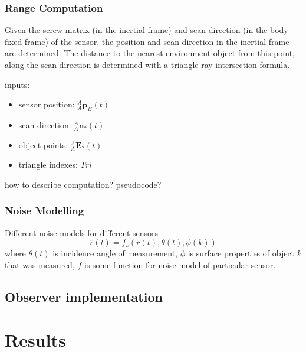 	\subsubsection{Range Computation}
	Given the screw matrix (in the inertial frame) and scan direction (in the body fixed frame) of the sensor, the position and scan direction in the inertial frame are determined.
	The distance to the nearest environment object from this point, along the scan direction is determined with a triangle-ray intersection formula.
	
	inputs:
	\begin{itemize}
	\item sensor position: ${^{A}_{A}\mathbf{p}^{}_{B}}(t)$
	\item scan direction: ${^{A}_{A}\mathbf{n}^{}_{?}}(t)$
	\item object points: ${^{A}_{A}\mathbf{E}^{}_{?}}(t)$
	\item triangle indexes:	$Tri$
	\end{itemize}
	
	how to describe computation? pseudocode?\\
	
	\subsubsection{Noise Modelling}
	Different noise models for different sensors
	\begin{equation}
		\hat{r}(t) = f_s(r(t),\theta(t),\phi(k))
	\end{equation}
	where $\theta(t)$ is incidence angle of measurement, $\phi$ is surface properties of object $k$ that was measured, $f$ is some function for noise model of particular sensor.
	
\subsection{Observer implementation}
\section{Results}
